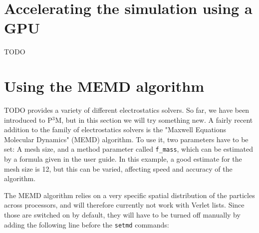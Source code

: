 \documentclass[
a4paper,                        %
11pt,                           %
twoside,                        %
footsepline,                    %
headsepline,                    %
headexclude,                    %
footexclude,                    %
pagesize,                       %
]{scrartcl}
\begin{document}
\section{Accelerating the simulation using a GPU}

TODO

\section{Using the MEMD algorithm}

TODO
\iffalse
\es{} provides a variety of different electrostatics solvers. So far,
we have been introduced to P$^3$M, but in this section we will try
something new. A fairly recent addition to the family of electrostatics
solvers is the "Maxwell Equations Molecular Dynamics" (MEMD) algorithm.
To use it, two parameters have to be set: A mesh size, and a method
parameter called \verb|f_mass|, which can be estimated by a formula
given in the \es{} user guide. In this example, a good estimate for
the mesh size is 12, but this can be varied, affecting speed and
accuracy of the algorithm.

The MEMD algorithm relies on a very specific spatial distribution of
the particles across processors, and will therefore currently not work
with Verlet lists. Since those are switched on by default, they will
have to be turned off manually by adding the following line before the
\verb|setmd| commands:
\end{document}
